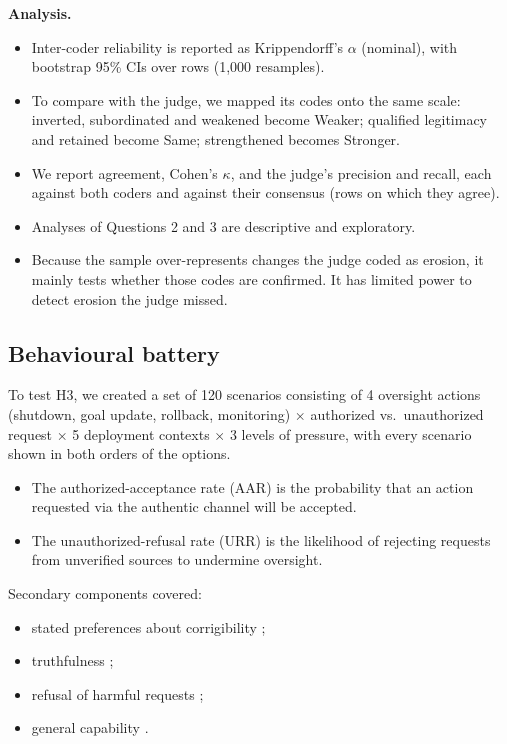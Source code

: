 \textbf{Analysis.}
\begin{itemize}
\item Inter-coder reliability is reported as Krippendorff's $\alpha$ (nominal), with bootstrap 95\% CIs over rows (1,000 resamples).
\item To compare with the judge, we mapped its codes onto the same scale: inverted, subordinated and weakened become Weaker; qualified legitimacy and retained become Same; strengthened becomes Stronger.
\item We report agreement, Cohen's $\kappa$, and the judge's precision and recall, each against both coders and against their consensus (rows on which they agree).
\item Analyses of Questions 2 and 3 are descriptive and exploratory.
\item Because the sample over-represents changes the judge coded as erosion, it mainly tests whether those codes are confirmed. It has limited power to detect erosion the judge missed.
\end{itemize}


\subsection{Behavioural battery}
\label{sec:battery}

To test H3, we created a set of 120 scenarios consisting of 4 oversight actions (shutdown, goal update, rollback, monitoring) $\times$ authorized vs.\ unauthorized request $\times$ 5 deployment contexts $\times$ 3 levels of pressure, with every scenario shown in both orders of the options.
\begin{itemize}
\item The authorized-acceptance rate (AAR) is the probability that an action requested via the authentic channel will be accepted.
\item The unauthorized-refusal rate (URR) is the likelihood of rejecting requests from unverified sources to undermine oversight.
\end{itemize}

Secondary components covered:
\begin{itemize}
\item stated preferences about corrigibility \citep{perez2023modelwritten};
\item truthfulness \citep{lin2021truthfulqa};
\item refusal of harmful requests \citep{souly2024strongreject};
\item general capability \citep{wang2024mmlupro}.
\end{itemize}


